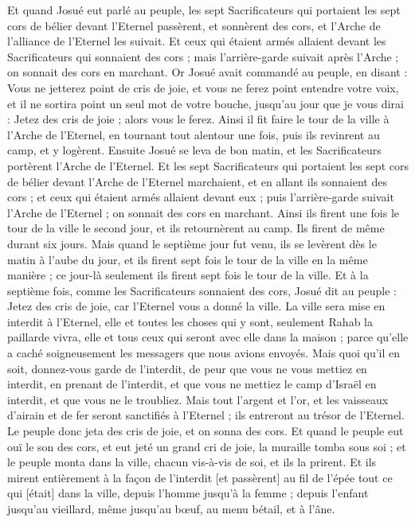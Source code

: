 \begin{multicols}{2}
Et quand Josué eut parlé au peuple, les sept Sacrificateurs qui portaient les sept cors de bélier devant l'Eternel passèrent, et sonnèrent des cors, et l'Arche de l'alliance de l'Eternel les suivait.
Et ceux qui étaient armés allaient devant les Sacrificateurs qui sonnaient des cors ; mais l'arrière-garde suivait après l'Arche ; on sonnait des cors en marchant.
Or Josué avait commandé au peuple, en disant : Vous ne jetterez point de cris de joie, et vous ne ferez point entendre votre voix, et il ne sortira point un seul mot de votre bouche, jusqu'au jour que je vous dirai : Jetez des cris de joie ; alors vous le ferez.
Ainsi il fit faire le tour de la ville à l'Arche de l'Eternel, en tournant tout alentour une fois, puis ils revinrent au camp, et y logèrent.
Ensuite Josué se leva de bon matin, et les Sacrificateurs portèrent l'Arche de l'Eternel.
Et les sept Sacrificateurs qui portaient les sept cors de bélier devant l'Arche de l'Eternel marchaient, et en allant ils sonnaient des cors ; et ceux qui étaient armés allaient devant eux ; puis l'arrière-garde suivait l'Arche de l'Eternel ; on sonnait des cors en marchant.
Ainsi ils firent une fois le tour de la ville le second jour, et ils retournèrent au camp. Ils firent de même durant six jours.
Mais quand le septième jour fut venu, ils se levèrent dès le matin à l'aube du jour, et ils firent sept fois le tour de la ville en la même manière ; ce jour-là seulement ils firent sept fois le tour de la ville.
Et à la septième fois, comme les Sacrificateurs sonnaient des cors, Josué dit au peuple : Jetez des cris de joie, car l'Eternel vous a donné la ville.
La ville sera mise en interdit à l'Eternel, elle et toutes les choses qui y sont, seulement Rahab la paillarde vivra, elle et tous ceux qui seront avec elle dans la maison ; parce qu'elle a caché soigneusement les messagers que nous avions envoyés.
Mais quoi qu'il en soit, donnez-vous garde de l'interdit, de peur que vous ne vous mettiez en interdit, en prenant de l'interdit, et que vous ne mettiez le camp d'Israël en interdit, et que vous ne le troubliez.
Mais tout l'argent et l'or, et les vaisseaux d'airain et de fer seront sanctifiés à l'Eternel ; ils entreront au trésor de l'Eternel.
Le peuple donc jeta des cris de joie, et on sonna des cors. Et quand le peuple eut ouï le son des cors, et eut jeté un grand cri de joie, la muraille tomba sous soi ; et le peuple monta dans la ville, chacun vis-à-vis de soi, et ils la prirent.
Et ils mirent entièrement à la façon de l'interdit [et passèrent] au fil de l'épée tout ce qui [était] dans la ville, depuis l'homme jusqu'à la femme ; depuis l'enfant jusqu'au vieillard, même jusqu'au bœuf, au menu bétail, et à l'âne.

\end{multicols}
